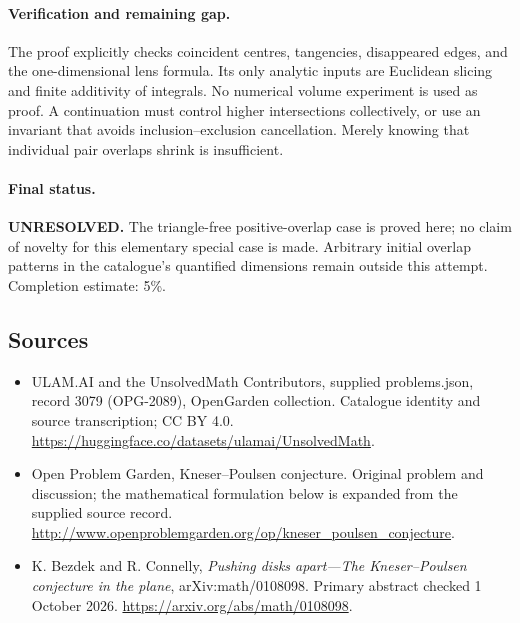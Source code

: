 \documentclass[11pt,a4paper]{article}
\begin{document}
\paragraph{Verification and remaining gap.}
The proof explicitly checks coincident centres, tangencies, disappeared edges,
and the one-dimensional lens formula. Its only analytic inputs are Euclidean
slicing and finite additivity of integrals. No numerical volume experiment is
used as proof. A continuation must control higher intersections collectively,
or use an invariant that avoids inclusion--exclusion cancellation. Merely
knowing that individual pair overlaps shrink is insufficient.

\paragraph{Final status.}
\textbf{UNRESOLVED.} The triangle-free positive-overlap case is proved here;
no claim of novelty for this elementary special case is made. Arbitrary
initial overlap patterns in the catalogue's quantified dimensions remain
outside this attempt. Completion estimate: 5\%.

\subsection{Sources}
\begin{itemize}
\item[S1] ULAM.AI and the UnsolvedMath Contributors, supplied problems.json, record 3079 (OPG-2089), OpenGarden collection. Catalogue identity and source transcription; CC BY 4.0.
\url{https://huggingface.co/datasets/ulamai/UnsolvedMath}.
\item[S2] Open Problem Garden, Kneser–Poulsen conjecture. Original problem and discussion; the mathematical formulation below is expanded from the supplied source record.
\url{http://www.openproblemgarden.org/op/kneser_poulsen_conjecture}.
\item[A1] K. Bezdek and R. Connelly, \emph{Pushing disks apart---The Kneser--Poulsen conjecture in the plane}, arXiv:math/0108098. Primary abstract checked 1 October 2026. \url{https://arxiv.org/abs/math/0108098}.
\end{itemize}
\end{document}
